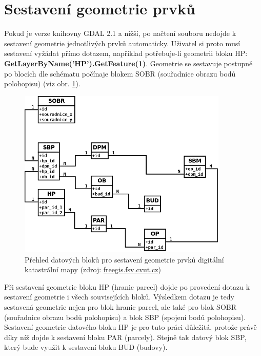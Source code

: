 \section{Sestavení geometrie prvků}
\label{sec:sestaveni_geometrie}
Pokud je verze knihovny GDAL 2.1 a nižší, po načtení  souboru
nedojde k sestavení geometrie jednotlivých prvků automaticky. Uživatel
si proto musí sestavení
vyžádat přímo dotazem, například potřebuje-li geometrii bloku HP:
\textbf{GetLayerByName('HP').GetFeature(1)}. Geo\-metrie se sestavuje
postupně po blocích dle schématu počínaje blokem SOBR (souřadnice
obrazu bodů polohopisu) (viz obr. \ref{fig:vfk_diagram_geom}).
\begin{figure}[H]
	 \centering
      \includegraphics[width=10cm]{./pictures/Vfk-diagram-geom.png}
      \caption{Přehled datových bloků pro sestavení geometrie prvků digitální katastrální mapy (zdroj:
      \href{http://freegis.fsv.cvut.cz/wiki/images/thumb/8/8a/Vfk-diagram-geom.png/744px-Vfk-diagram-geom.png}{freegis.fsv.cvut.cz})}
      \label{fig:vfk_diagram_geom}
\end{figure}
Při sestavení geometrie bloku HP (hranic parcel) dojde po
provedení dotazu k sestavení geometrie i
všech souvisejících bloků. Výsledkem dotazu je tedy sestavená geometrie
nejen pro blok hranic parcel, ale také pro blok SOBR (souřadnice
obrazu bodů polohopisu) a blok SBP (spojení bodů
polohopisu). Sestavení geometrie datového bloku HP je pro tuto práci důležitá,
protože právě díky níž dojde k sestavení bloku PAR (parcely). Stejně tak
datový blok SBP, který bude využit k sestavení bloku BUD (budovy).
